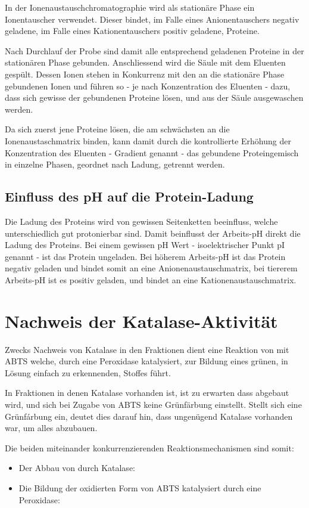 \documentclass[a4paper,german]{scrreprt}
\begin{document}
In der Ionenaustauschchromatographie wird als stationäre Phase ein
Ionentauscher verwendet. Dieser bindet, im Falle eines Anionentauschers negativ
geladene, im Falle eines Kationentauschers positiv geladene, Proteine.

Nach Durchlauf der Probe sind damit alle entsprechend geladenen Proteine in der
stationären Phase gebunden. Anschliessend wird die Säule mit dem Eluenten
gespült. Dessen Ionen stehen in Konkurrenz mit den an die stationäre Phase
gebundenen Ionen und führen so - je nach Konzentration des Eluenten - dazu,
dass sich gewisse der gebundenen Proteine lösen, und aus der Säule ausgewaschen
werden.

Da sich zuerst jene Proteine lösen, die am schwächsten an die
Ionenaustaschmatrix binden, kann damit durch die kontrollierte Erhöhung der
Konzentration des Eluenten - Gradient genannt - das gebundene Proteingemisch in
einzelne Phasen, geordnet nach Ladung, getrennt werden.

\subsection{Einfluss des pH auf die Protein-Ladung}

Die Ladung des Proteins wird von gewissen Seitenketten beeinfluss, welche
unterschiedlich gut protonierbar sind. Damit beinflusst der Arbeits-pH direkt
die Ladung des Proteins. Bei einem gewissen pH Wert - isoelektrischer Punkt pI
genannt - ist das Protein ungeladen. Bei höherem Arbeits-pH ist das Protein
negativ geladen und bindet somit an eine Anionenaustauschmatrix, bei tiererem
Arbeits-pH ist es positiv geladen, und bindet an eine Kationenaustauschmatrix.

\section{Nachweis der Katalase-Aktivität}

Zwecks Nachweis von Katalase in den Fraktionen dient eine Reaktion von
 mit ABTS welche, durch eine Peroxidase katalysiert, zur Bildung eines
grünen, in Lösung einfach zu erkennenden, Stoffes führt.

In Fraktionen in denen Katalase vorhanden ist, ist zu erwarten dass 
abgebaut wird, und sich bei Zugabe von ABTS keine Grünfärbung einstellt. Stellt
sich eine Grünfárbung ein, deutet dies darauf hin, dass ungenügend Katalase
vorhanden war, um alles  abzubauen.

Die beiden miteinander konkurrenzierenden Reaktionsmechanismen sind somit:
\begin{itemize}
	\item Der Abbau von  durch Katalase: 
	\item Die Bildung der oxidierten Form von ABTS katalysiert durch eine
		Peroxidase: 
\end{itemize}
\end{document}
